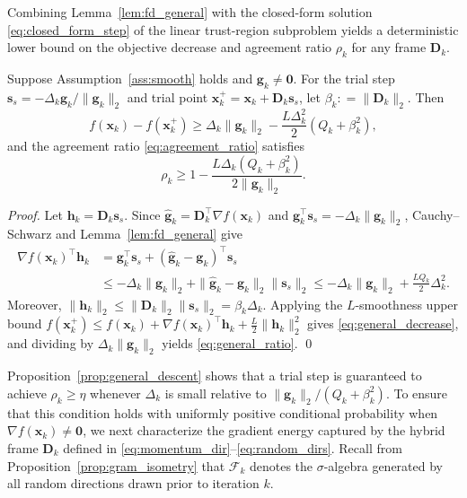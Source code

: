 \documentclass[smallextended]{svjour3}
\newcommand{\bx}{\bm{x}}
\newcommand{\bg}{\bm{g}}
\newcommand{\bs}{\bm{s}}
\providecommand{\coloneqq}{\mathrel{\mathop:}=}
\begin{document}
Combining Lemma~\ref{lem:fd_general} with the closed-form solution \eqref{eq:closed_form_step} of the linear trust-region subproblem yields a deterministic lower bound on the objective decrease and agreement ratio $\rho_k$ for any frame $\bm D_k$.

\begin{proposition}
\label{prop:general_descent}
\label{prop:descent}
Suppose Assumption~\ref{ass:smooth} holds and $\bg_k\ne\bm0$. For the trial step $\bs_s = -\Delta_k \bg_k / \|\bg_k\|_2$ and trial point $\bx_k^+ = \bx_k+\bm D_k\bs_s$, let $\beta_k \coloneqq \|\bm D_k\|_2$. Then
\begin{equation}
\label{eq:general_decrease}
f(\bx_k)-f(\bx_k^+) \ge \Delta_k\|\bg_k\|_2 - \frac{L\Delta_k^2}{2} (Q_k+\beta_k^2),
\end{equation}
and the agreement ratio \eqref{eq:agreement_ratio} satisfies
\begin{equation}
\label{eq:general_ratio}
\rho_k \ge 1 - \frac{L\Delta_k(Q_k+\beta_k^2)}{2\|\bg_k\|_2}.
\end{equation}
\end{proposition}

\begin{proof}
Let $\bm h_k = \bm D_k\bs_s$. Since $\hat{\bg}_k = \bm D_k^\top\nabla f(\bx_k)$ and $\bg_k^\top\bs_s = -\Delta_k\|\bg_k\|_2$, Cauchy--Schwarz and Lemma~\ref{lem:fd_general} give
\[
\begin{aligned}
\nabla f(\bx_k)^\top\bm h_k &= \bg_k^\top\bs_s + (\hat{\bg}_k-\bg_k)^\top\bs_s \\
&\le -\Delta_k\|\bg_k\|_2 + \|\hat{\bg}_k-\bg_k\|_2\|\bs_s\|_2 \le -\Delta_k\|\bg_k\|_2 + \frac{LQ_k}{2}\Delta_k^2.
\end{aligned}
\]
Moreover, $\|\bm h_k\|_2 \le \|\bm D_k\|_2\|\bs_s\|_2 = \beta_k\Delta_k$. Applying the $L$-smoothness upper bound $f(\bx_k^+) \le f(\bx_k) + \nabla f(\bx_k)^\top\bm h_k + \frac{L}{2}\|\bm h_k\|_2^2$ gives \eqref{eq:general_decrease}, and dividing by $\Delta_k\|\bg_k\|_2$ yields \eqref{eq:general_ratio}.
\qed
\end{proof}

Proposition~\ref{prop:general_descent} shows that a trial step is guaranteed to achieve $\rho_k \ge \eta$ whenever $\Delta_k$ is small relative to $\|\bg_k\|_2 / (Q_k + \beta_k^2)$. To ensure that this condition holds with uniformly positive conditional probability when $\nabla f(\bx_k) \ne \bm 0$, we next characterize the gradient energy captured by the hybrid frame $\bm D_k$ defined in \eqref{eq:momentum_dir}--\eqref{eq:random_dirs}. Recall from Proposition~\ref{prop:gram_isometry} that $\mathcal F_k$ denotes the $\sigma$-algebra generated by all random directions drawn prior to iteration $k$.
\end{document}
